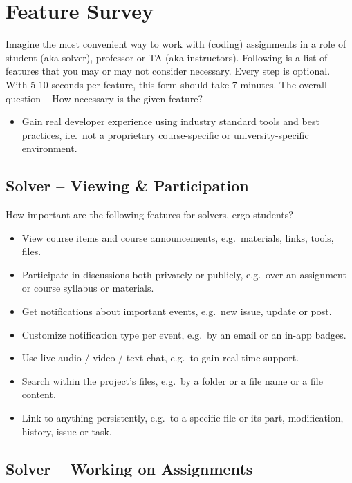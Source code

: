 \chapter{Feature Survey} \label{apx:survey}

Imagine the most convenient way to work with (coding) assignments in a role of student (aka solver), professor or TA (aka instructors). Following is a list of features that you may or may not consider necessary. Every step is optional. With 5-10 seconds per feature, this form should take 7 minutes. The overall question -- How necessary is the given feature?

\begin{itemize}
\item
  Gain real developer experience using industry standard tools and best practices, i.e.~not a proprietary course-specific or university-specific environment.
\end{itemize}

\section{Solver -- Viewing \& Participation}\label{sec:solver-viewing-participation}

How important are the following features for solvers, ergo students?

\begin{itemize}
\item
  View course items and course announcements, e.g.~materials, links, tools, files.
\item
  Participate in discussions both privately or publicly, e.g.~over an assignment or course syllabus or materials.
\item
  Get notifications about important events, e.g.~new issue, update or post.
\item
  Customize notification type per event, e.g.~by an email or an in-app badges.
\item
  Use live audio / video / text chat, e.g.~to gain real-time support.
\item
  Search within the project's files, e.g.~by a folder or a file name or a file content.
\item
  Link to anything persistently, e.g.~to a specific file or its part, modification, history, issue or task.
\end{itemize}

\section{Solver -- Working on Assignments}\label{sec:solver-working-on-assignments}

